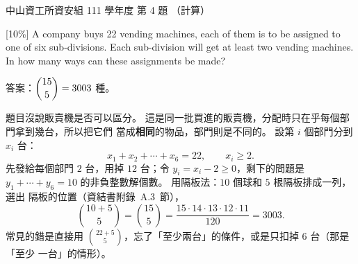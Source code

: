 \begin{pastexam}[label={px:nsysu-111-dmalg-02}]{中山資工所資安組 111 學年度 第 4 題}
（計算）

{[10\%]} A company buys 22 vending machines, each of them is to be assigned to one of six
sub-divisions. Each sub-division will get at least two vending machines. In how many ways can these
assignments be made?
\end{pastexam}

\begin{pastsoln}
答案：$\dbinom{15}{5} = 3003$ 種。

題目沒說販賣機是否可以區分。 這是同一批買進的販賣機，分配時只在乎每個部門拿到幾台，所以把它們
當成\textbf{相同}的物品，部門則是不同的。 設第 $i$ 個部門分到 $x_i$ 台：
\[
x_1 + x_2 + \cdots + x_6 = 22, \qquad x_i \ge 2 .
\]
先發給每個部門 $2$ 台，用掉 $12$ 台；令 $y_i = x_i - 2 \ge 0$，剩下的問題是
$y_1 + \cdots + y_6 = 10$ 的非負整數解個數。 用隔板法：$10$ 個球和 $5$ 根隔板排成一列，選出
隔板的位置（資結書附錄~A.3~節），
\[
\binom{10 + 5}{5} = \binom{15}{5} = \frac{15 \cdot 14 \cdot 13 \cdot 12 \cdot 11}{120} = 3003 .
\]
常見的錯是直接用 $\binom{22 + 5}{5}$，忘了「至少兩台」的條件，或是只扣掉 $6$ 台（那是「至少
一台」的情形）。
\end{pastsoln}
